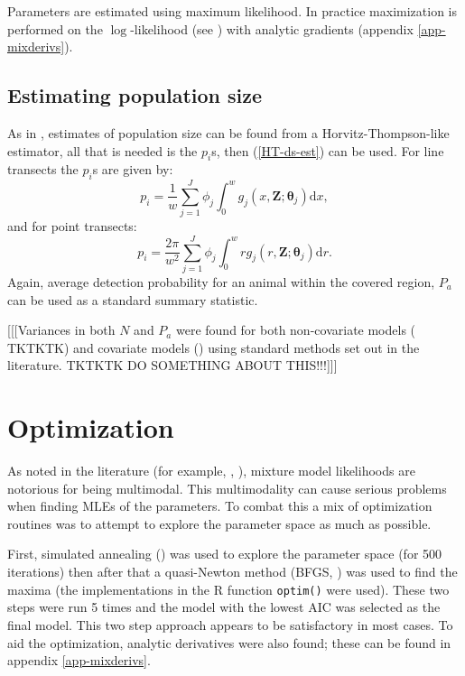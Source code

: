 Parameters are estimated using maximum likelihood. In practice maximization is performed on the $\log$-likelihood (see ) with analytic gradients (appendix \ref{app-mixderivs}).



\subsection{Estimating population size}

As in , estimates of population size can be found from a Horvitz-Thompson-like estimator, all that is needed is the $p_i$s, then (\ref{HT-ds-est}) can be used. For line transects the $p_i$s are given by:
\begin{equation*}
p_i = \frac{1}{w} \sum_{j=1}^J \phi_j \int_0^w  g_j(x,\mathbf{Z}; \bm{\theta}_j) \text{d}x,
\end{equation*}
and for point transects:
\begin{equation*}
p_i = \frac{2\pi}{w^2} \sum_{j=1}^J \phi_j \int_0^w  r g_j(r,\mathbf{Z}; \bm{\theta}_j) \text{d}r.
\end{equation*}
Again, average detection probability for an animal within the covered region, $P_a$ can be used as a standard summary statistic.

[[[Variances in both $N$ and $P_a$ were found for both non-covariate models (\cite[Appendix C]{yellowbook} TKTKTK) and covariate models (\cite[pp. 38-43]{ADS}) using standard methods set out in the literature. TKTKTK DO SOMETHING ABOUT THIS!!!]]]

\section{Optimization}
\label{s:optimization}

As noted in the literature (for example, \cite[463-480]{BDA}, \cite{robert}), mixture model likelihoods are notorious for being multimodal. This multimodality can cause serious problems when finding MLEs of the parameters. To combat this a mix of optimization routines was to attempt to explore the parameter space as  much as possible.

First, simulated annealing (\cite[pp. 549-554]{numrec}) was used to explore the parameter space (for 500 iterations) then after that a quasi-Newton method (BFGS, \cite{bfgs}) was used to find the maxima (the implementations in the \textsf{R} function \texttt{optim()} were used). These two steps were run 5 times and the model with the lowest AIC was selected as the final model. This two step approach appears to be satisfactory in most cases. To aid the optimization, analytic derivatives were also found; these can be found in appendix \ref{app-mixderivs}.

